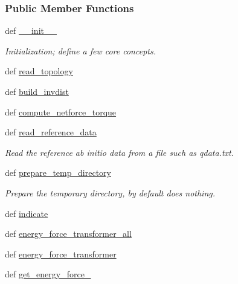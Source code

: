 \subsubsection*{\-Public \-Member \-Functions}
\begin{DoxyCompactItemize}
\item 
def \hyperlink{classforcebalance_1_1abinitio_1_1AbInitio_ad6d702694d6cd99e3432183e5c4860c9}{\-\_\-\-\_\-init\-\_\-\-\_\-}
\begin{DoxyCompactList}\small\item\em \-Initialization; define a few core concepts. \end{DoxyCompactList}\item 
def \hyperlink{classforcebalance_1_1abinitio_1_1AbInitio_a9f405c452a0a4081cd7da07938520920}{read\-\_\-topology}
\item 
def \hyperlink{classforcebalance_1_1abinitio_1_1AbInitio_a7475857193eefd4edd020d4f2a8fec17}{build\-\_\-invdist}
\item 
def \hyperlink{classforcebalance_1_1abinitio_1_1AbInitio_afbf86c26158a68cae7460b4106809fdd}{compute\-\_\-netforce\-\_\-torque}
\item 
def \hyperlink{classforcebalance_1_1abinitio_1_1AbInitio_aa73bedbf1e2cf19f2fa1e88815f1bd86}{read\-\_\-reference\-\_\-data}
\begin{DoxyCompactList}\small\item\em \-Read the reference ab initio data from a file such as qdata.\-txt. \end{DoxyCompactList}\item 
def \hyperlink{classforcebalance_1_1abinitio_1_1AbInitio_a2d0f465f1988fd6bc611f7de4b59fd04}{prepare\-\_\-temp\-\_\-directory}
\begin{DoxyCompactList}\small\item\em \-Prepare the temporary directory, by default does nothing. \end{DoxyCompactList}\item 
def \hyperlink{classforcebalance_1_1abinitio_1_1AbInitio_a3260db78e8c174f04a64661c4e5c181c}{indicate}
\item 
def \hyperlink{classforcebalance_1_1abinitio_1_1AbInitio_a3d28520925c6dfd179647d0abf7e1368}{energy\-\_\-force\-\_\-transformer\-\_\-all}
\item 
def \hyperlink{classforcebalance_1_1abinitio_1_1AbInitio_a9167da321a9fff748eef5ebe754cc7ca}{energy\-\_\-force\-\_\-transformer}
\item 
def \hyperlink{classforcebalance_1_1abinitio_1_1AbInitio_a313c848f46579817803c8a3ff100974e}{get\-\_\-energy\-\_\-force\-\_\-}

\end{DoxyCompactItemize}
